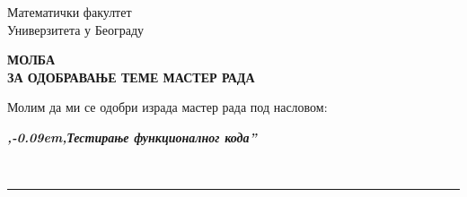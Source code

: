 \documentclass[a4paper]{article}
\def\zn{,\kern-0.09em,}
\begin{document}
\thispagestyle{empty}

\begin{flushleft}
Математички факултет\\
Универзитета у Београду
\end{flushleft}

\bigskip

\begin{center}
\textbf{МОЛБА\\
ЗА ОДОБРАВАЊЕ ТЕМЕ МАСТЕР РАДА
}\end{center}

\bigskip

\begin{flushleft}
Молим да ми се одобри израда мастер рада под насловом:
\end{flushleft}

\begin{minipage}{16.5cm}
\textbf{\textit{\zn Тестирање функционалног кода''}}
\end{minipage}\\
\rule[4mm]{17.5cm}{.05mm}
\end{document}
